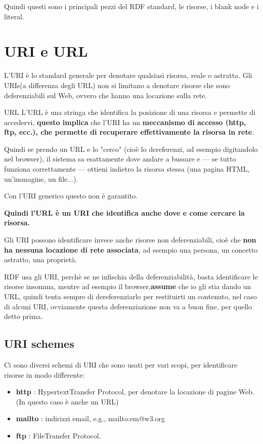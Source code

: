 Quindi questi sono i principali pezzi del RDF standard, le risorse, i blank node e i literal.



\section{URI e URL}
L'URI è lo standard generale per denotare qualsiasi risorsa, reale o astratta.
Gli URIs(a differenza degli URL) non si limitano a denotare risorse che sono deferenziabili sul Web,
ovvero che hanno una locazione sulla rete.

\begin{definition}{URL}
    L'URL è una stringa che identifica la posizione di una risorsa e permette di accedervi, \textbf{questo implica}
    che l'URI ha un \textbf{meccanismo di accesso (http, ftp, ecc.), che permette di recuperare effettivamente la risorsa in rete}.

    Quindi se prendo un URL e lo "cerco" (cioè lo dereferenzi, ad esempio digitandolo nel browser),
    il sistema sa esattamente dove andare a bussare e — se tutto funziona correttamente — ottieni indietro la risorsa stessa (una pagina HTML, un'immagine, un file...).

    Con l'URI generico questo non è garantito.
\end{definition}

\textbf{Quindi l'URL è un URI che identifica anche dove e come cercare la risorsa.}

Gli URI possono identificare invece anche risorse non deferenziabili, cioè che \textbf{non ha nessuna locazione di rete associata}, 
ad esempio una persona, un concetto astratto, una proprietà.



RDF usa gli URI, perchè se ne infischia della deferenziabilità, basta identificare le risorse insomma, mentre ad esempio il browser,\textbf{assume}
che io gli stia dando un URL, quindi tenta sempre di dereferenziarlo per restituirti un contenuto, nel caso di alcuni URI, ovviamente questa 
deferenziazione non va a buon fine, per quello detto prima.

\subsection{URI schemes}
Ci sono diversi schemi di URI che sono usati per vari scopi, per identificare risorse in modo differente:
\begin{itemize}
    \item \textbf{http} : HypertextTransfer Protocol, per denotare la locazione di pagine Web. (In questo caso è anche un URL)
    \item \textbf{mailto} : indirizzi email, e.g., mailto:em@w3.org
    \item \textbf{ftp} : FileTransfer Protocol.
\end{itemize}
